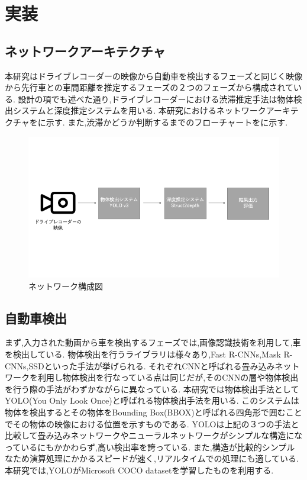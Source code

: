 \newpage
\section{実装}
\subsection{ネットワークアーキテクチャ}
本研究はドライブレコーダーの映像から自動車を検出するフェーズと同じく映像から先行車との車間距離を推定するフェーズの２つのフェーズから構成されている.
設計の項でも述べた通り,ドライブレコーダーにおける渋滞推定手法は物体検出システムと深度推定システムを用いる.
本研究におけるネットワークアーキテクチャをに示す.
また,渋滞かどうか判断するまでのフローチャートをに示す.

\begin{figure}[htbp]
  \begin{center}
    \includegraphics[width=12cm]{figs/system_buildver1.png}
    \caption{ネットワーク構成図}
    \label{fig:system_arch}
  \end{center}
\end{figure}


\subsection{自動車検出}
まず,入力された動画から車を検出するフェーズでは,画像認識技術を利用して,車を検出している.
物体検出を行うライブラリは様々あり,Fast R-CNNs,Mask R-CNNs,SSDといった手法が挙げられる.
それぞれCNNと呼ばれる畳み込みネットワークを利用し物体検出を行なっている点は同じだが,そのCNNの層や物体検出を行う際の手法がわずかながらに異なっている.
本研究では物体検出手法としてYOLO(You Only Look Once)と呼ばれる物体検出手法を用いる.
このシステムは物体を検出するとその物体をBounding Box(BBOX)と呼ばれる四角形で囲むことでその物体の映像における位置を示すものである.
YOLOは上記の３つの手法と比較して畳み込みネットワークやニューラルネットワークがシンプルな構造になっているにもかかわらず,高い検出率を誇っている.
また,構造が比較的シンプルなため演算処理にかかるスピードが速く,リアルタイムでの処理にも適している.
本研究では,YOLOがMicrosoft COCO datasetを学習したものを利用する.

